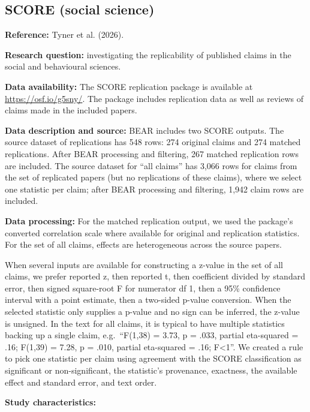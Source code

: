\documentclass[
  11pt,
]{article}
\begin{document}
\newpage

\subsection{SCORE (social science)}\label{score-social-science}

\textbf{Reference:} {Tyner et al.} (2026).

\textbf{Research question:} investigating the replicability of published
claims in the social and behavioural sciences.

\textbf{Data availability:} The SCORE replication package is available
at \url{https://osf.io/g5sny/}. The package includes replication data as
well as reviews of claims made in the included papers.

\textbf{Data description and source:} BEAR includes two SCORE outputs.
The source dataset of replications has 548 rows: 274 original claims and
274 matched replications. After BEAR processing and filtering, 267
matched replication rows are included. The source dataset for ``all
claims'' has 3,066 rows for claims from the set of replicated papers
(but no replications of these claims), where we select one statistic per
claim; after BEAR processing and filtering, 1,942 claim rows are
included.

\textbf{Data processing:} For the matched replication output, we used
the package's converted correlation scale where available for original
and replication statistics. For the set of all claims, effects are
heterogeneous across the source papers.

When several inputs are available for constructing a z-value in the set
of all claims, we prefer reported z, then reported t, then coefficient
divided by standard error, then signed square-root F for numerator df 1,
then a 95\% confidence interval with a point estimate, then a two-sided
p-value conversion. When the selected statistic only supplies a p-value
and no sign can be inferred, the z-value is unsigned. In the text for
all claims, it is typical to have multiple statistics backing up a
single claim, e.g.~``F(1,38) = 3.73, p = .033, partial eta-squared =
.16; F(1,39) = 7.28, p = .010, partial eta-squared = .16; F\textless1''.
We created a rule to pick one statistic per claim using agreement with
the SCORE classification as significant or non-significant, the
statistic's provenance, exactness, the available effect and standard
error, and text order.

\textbf{Study characteristics:}
\end{document}
